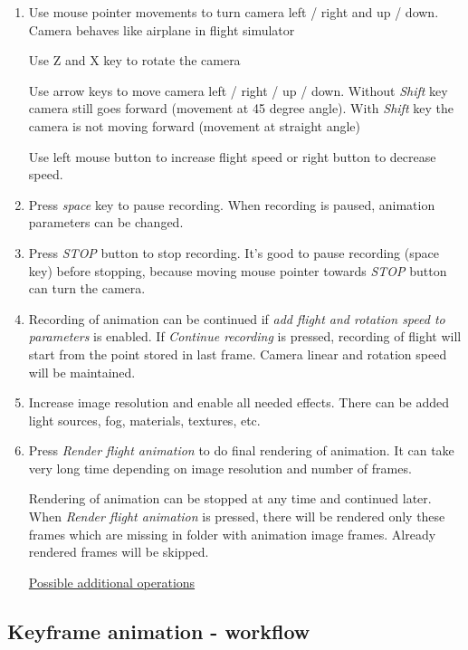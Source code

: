 \begin{enumerate}
	\item Use mouse pointer movements to turn camera left / right and up / down. Camera behaves like airplane in flight simulator
	
	Use Z and X key to rotate the camera
	
	Use arrow keys to move camera left / right / up / down. Without \emph{Shift} key camera still goes forward (movement at 45 degree angle). With \emph{Shift} key the camera is not moving forward (movement at straight angle)
	
	Use left mouse button to increase flight speed or right button to decrease speed.
	
	\item Press \emph{space} key to pause recording. When recording is paused, animation parameters can be changed. 
	
	\item Press \emph{STOP} button to stop recording. It's good to pause recording (space key) before stopping, because moving mouse pointer towards \emph{STOP} button can turn the camera.
	
	\item Recording of animation can be continued if \emph{add flight and rotation speed to parameters} is enabled. If \emph{Continue recording} is pressed, recording of flight will start from the point stored in last frame. Camera linear and rotation speed will be maintained.
	
	\item Increase image resolution and enable all needed effects. There can be added light sources, fog, materials, textures, etc.
	
	\item Press \emph{Render flight animation} to do final rendering of animation. It can take very long time depending on image resolution and number of frames.
	
	Rendering of animation can be stopped at any time and continued later. When \emph{Render flight animation} is pressed, there will be rendered only these frames which are missing in folder with animation image frames. Already rendered frames will be skipped.
	
	\underline{Possible additional operations}
	
	
\end{enumerate}

\subsection{Keyframe animation - workflow}\label{keyframe-animation}
